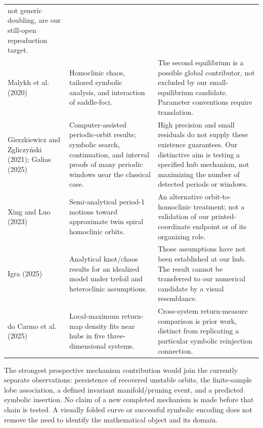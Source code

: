 \begin{longtable}{@{}P{0.24\textwidth}P{0.32\textwidth}P{0.35\textwidth}@{}}
not generic doubling, are our still-open reproduction target. \\[0.5em]
Malykh et al. (2020) \citep{malykh2020homoclinic} &
Homoclinic chaos, tailored symbolic analysis, and interaction of saddle-foci. &
The second equilibrium is a possible global contributor, not excluded by
our small-equilibrium candidate. Parameter conventions require translation. \\[0.5em]
Gierzkiewicz and Zgliczy\'nski (2021); Galias (2025)
\citep{gierzkiewicz2021periodic,galias2025symbolic} &
Computer-assisted periodic-orbit results; symbolic search, continuation,
and interval proofs of many periodic windows near the classical case. &
High precision and small residuals do not supply these existence guarantees.
Our distinctive aim is testing a specified hub mechanism, not maximizing
the number of detected periods or windows. \\[0.5em]
Xing and Luo (2023) \citep{xing2023period1} &
Semi-analytical period-1 motions toward approximate twin spiral homoclinic
orbits. &
An alternative orbit-to-homoclinic treatment; not a validation of our
printed-coordinate endpoint or of its organizing role. \\[0.5em]
Igra (2025) \citep{igra2025knots} &
Analytical knot/chaos results for an idealized model under trefoil and
heteroclinic assumptions. &
Those assumptions have not been established at our hub. The result cannot
be transferred to our numerical candidate by a visual resemblance. \\[0.5em]
do Carmo et al. (2025) \citep{docarmo2025measure} &
Local-maximum return-map density fits near hubs in five three-dimensional systems. &
Cross-system return-measure comparison is prior work, distinct from
replicating a particular symbolic reinjection connection. \\
\end{longtable}
\normalsize

The strongest prospective mechanism contribution would join the currently
separate observations: persistence of recovered unstable orbits, the
finite-sample lobe association, a defined invariant manifold/pruning event,
and a predicted symbolic insertion. No claim of a new completed mechanism
is made before that chain is tested. A visually folded curve or successful
symbolic encoding does not remove the need to identify the mathematical
object and its domain.
